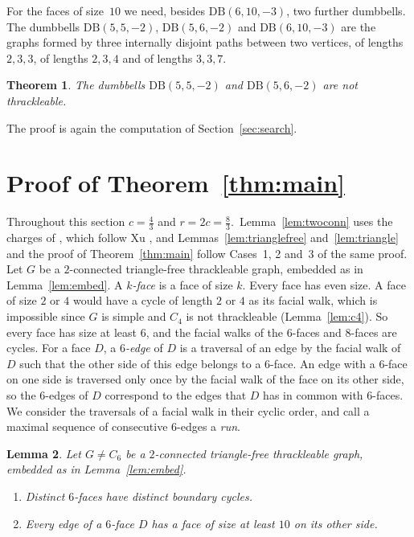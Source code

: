 \documentclass[11pt]{amsart}
\newtheorem{theorem}{Theorem}[section]
\newtheorem{lemma}[theorem]{Lemma}
\theoremstyle{definition}
\theoremstyle{remark}
\numberwithin{equation}{section}
\newcommand{\DB}{\mathrm{DB}}
\begin{document}
For the faces of size~$10$ we need, besides $\DB(6,10,-3)$, two further dumbbells. The dumbbells $\DB(5,5,-2)$, $\DB(5,6,-2)$ and $\DB(6,10,-3)$ are the graphs formed by three internally disjoint paths between two vertices, of lengths $2,3,3$, of lengths $2,3,4$ and of lengths $3,3,7$.

\begin{theorem}\label{thm:dbten}
The dumbbells $\DB(5,5,-2)$ and $\DB(5,6,-2)$ are not thrackleable.
\end{theorem}

The proof is again the computation of Section~\ref{sec:search}.

\section{Proof of Theorem~\ref{thm:main}}\label{sec:proof}

Throughout this section $c=\frac43$ and $r=2c=\frac83$.\ Lemma~\ref{lem:twoconn} uses the charges of \cite[proof of Theorem~1.1, Case~1]{Sco26}, which follow Xu \cite{Xu21}, and Lemmas~\ref{lem:trianglefree} and~\ref{lem:triangle} and the proof of Theorem~\ref{thm:main} follow Cases~1, 2 and~3 of the same proof. Let $G$ be a $2$-connected triangle-free thrackleable graph, embedded as in Lemma~\ref{lem:embed}. A \emph{$k$-face} is a face of size $k$. Every face has even size. A face of size $2$ or $4$ would have a cycle of length $2$ or $4$ as its facial walk, which is impossible since $G$ is simple and $C_4$ is not thrackleable (Lemma~\ref{lem:c4}). So every face has size at least $6$, and the facial walks of the $6$-faces and $8$-faces are cycles. For a face $D$, a \emph{$6$-edge} of $D$ is a traversal of an edge by the facial walk of $D$ such that the other side of this edge belongs to a $6$-face. An edge with a $6$-face on one side is traversed only once by the facial walk of the face on its other side, so the $6$-edges of $D$ correspond to the edges that $D$ has in common with $6$-faces. We consider the traversals of a facial walk in their cyclic order, and call a maximal sequence of consecutive $6$-edges a \emph{run}.

\begin{lemma}\label{lem:faces}
Let $G\ne C_6$ be a $2$-connected triangle-free thrackleable graph, embedded as in Lemma~\ref{lem:embed}.
\begin{enumerate}[label=(\alph*)]
\item Distinct $6$-faces have distinct boundary cycles.
\item Every edge of a $6$-face $D$ has a face of size at least $10$ on its other side.
\end{enumerate}
\end{lemma}
\end{document}

